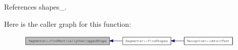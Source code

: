 References shapes\_\-.

Here is the caller graph for this function:\nopagebreak
\begin{figure}[H]
\begin{center}
\leavevmode
\includegraphics[width=311pt]{class_segmenter_0961de0db6a0b1de51882024bfc830a1_icgraph}
\end{center}
\end{figure}
